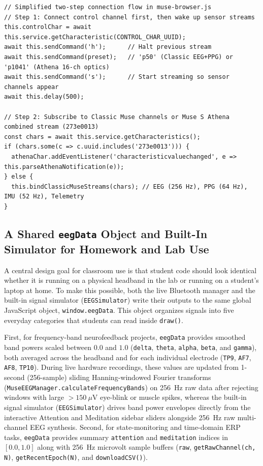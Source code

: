 \documentclass[11pt]{article}
\begin{document}
\noindent\begin{minipage}{\textwidth}
\begin{lstlisting}
// Simplified two-step connection flow in muse-browser.js
// Step 1: Connect control channel first, then wake up sensor streams
this.controlChar = await this.service.getCharacteristic(CONTROL_CHAR_UUID);
await this.sendCommand('h');      // Halt previous stream
await this.sendCommand(preset);   // 'p50' (Classic EEG+PPG) or 'p1041' (Athena 16-ch optics)
await this.sendCommand('s');      // Start streaming so sensor channels appear
await this.delay(500);

// Step 2: Subscribe to Classic Muse channels or Muse S Athena combined stream (273e0013)
const chars = await this.service.getCharacteristics();
if (chars.some(c => c.uuid.includes('273e0013'))) {
  athenaChar.addEventListener('characteristicvaluechanged', e => this.parseAthenaNotification(e));
} else {
  this.bindClassicMuseStreams(chars); // EEG (256 Hz), PPG (64 Hz), IMU (52 Hz), Telemetry
}
\end{lstlisting}
\end{minipage}
\vspace{4pt}

\subsection{A Shared \texttt{eegData} Object and Built-In Simulator for Homework and Lab Use}
A central design goal for classroom use is that student code should look identical whether it is running on a physical headband in the lab or running on a student's laptop at home. To make this possible, both the live Bluetooth manager and the built-in signal simulator (\texttt{EEGSimulator}) write their outputs to the same global JavaScript object, \texttt{window.eegData}. This object organizes signals into five everyday categories that students can read inside \texttt{draw()}.

First, for frequency-band neurofeedback projects, \texttt{eegData} provides smoothed band powers scaled between $0.0$ and $1.0$ (\texttt{delta}, \texttt{theta}, \texttt{alpha}, \texttt{beta}, and \texttt{gamma}), both averaged across the headband and for each individual electrode (\texttt{TP9}, \texttt{AF7}, \texttt{AF8}, \texttt{TP10}). During live hardware recordings, these values are updated from 1-second (256-sample) sliding Hanning-windowed Fourier transforms (\texttt{MuseEEGManager.calculateFrequencyBands}) on 256~Hz raw data after rejecting windows with large $>150\ \mu\text{V}$ eye-blink or muscle spikes, whereas the built-in signal simulator (\texttt{EEGSimulator}) drives band power envelopes directly from the interactive Attention and Meditation sidebar sliders alongside 256~Hz raw multi-channel EEG synthesis. Second, for state-monitoring and time-domain ERP tasks, \texttt{eegData} provides summary \texttt{attention} and \texttt{meditation} indices in $[0.0, 1.0]$ along with 256~Hz microvolt sample buffers (\texttt{raw}, \texttt{getRawChannel(ch, N)}, \texttt{getRecentEpoch(N)}, and \texttt{downloadCSV()}).
\end{document}
